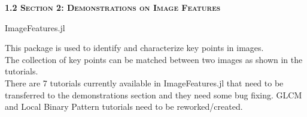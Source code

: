 \vspace{0.5cm}
\Large
\textbf{\textsc{1.2 Section 2: Demonstrations on Image Features}}

\vspace{0.5cm}
\Large
\textsf{ImageFeatures.jl}

\vspace{0.5cm}
\large
This package is used to identify and characterize key points in images.\\
The collection of key points can be matched between two images as shown in the tutorials.\\

There are 7 tutorials currently available in ImageFeatures.jl that need to be transferred to the demonstrations section and they need some bug fixing. GLCM and Local Binary Pattern tutorials need to be reworked/created. 

